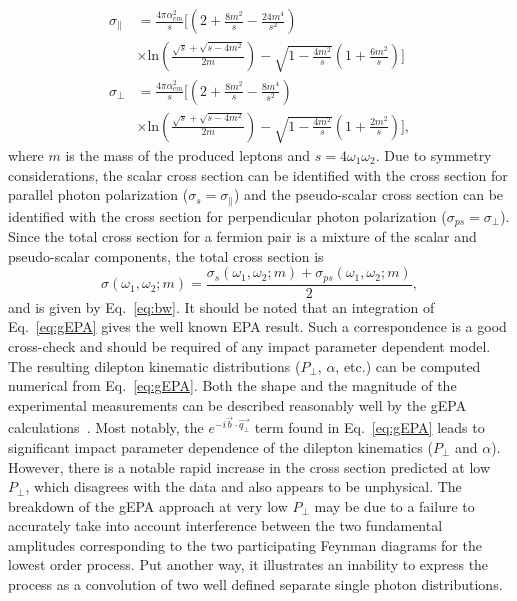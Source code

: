 \documentclass[12pt,epjc3]{svjour3}\sloppy
\begin{document}
\begin{equation}
    \label{eq:bw_pol}
    \begin{aligned}
    \sigma_{\parallel} & = \frac{4\pi \alpha_{em}^{2}}{s} \bigg[\left(2+\frac{8m^{2}}{s} - \frac{24m^{4}}{s^{2}}\right) \\ 
    & \times \text{ln}\left(\frac{\sqrt{s}+\sqrt{s-4m^{2}}}{2m}\right) -\sqrt{1-\frac{4m^{2}}{s}}\left(1+\frac{6m^{2}}{s}\right)\bigg]\\
    \sigma_{\perp} & = \frac{4\pi \alpha_{em}^{2}}{s} \bigg[\left(2+\frac{8m^{2}}{s} - \frac{8m^{4}}{s^{2}}\right) \\
    & \times\text{ln}\left(\frac{\sqrt{s}+\sqrt{s-4m^{2}}}{2m}\right) -\sqrt{1-\frac{4m^{2}}{s}}\left(1+\frac{2m^{2}}{s}\right)\bigg],
    \end{aligned}
\end{equation}
where $m$ is the mass of the produced leptons and $s=4\omega_1\omega_2$. Due to symmetry considerations, the scalar cross section can be identified with the cross section for parallel photon polarization ($\sigma_s=\sigma_\parallel$) and the pseudo-scalar cross section can be identified with the cross section for perpendicular photon polarization ($\sigma_{ps}=\sigma_\perp$). 
Since the total cross section for a fermion pair is a mixture of the scalar and pseudo-scalar components, the total cross section is 
\begin{equation}
    \sigma(\omega_1, \omega_2; m) = \frac{\sigma_{s}(\omega_1, \omega_2; m) + \sigma_{ps}(\omega_1, \omega_2; m)}{2},
\end{equation}
and is given by Eq.~\ref{eq:bw}. It should be noted that an integration of Eq.~\ref{eq:gEPA} gives the well known EPA result. Such a correspondence is a good cross-check and should be required of any impact parameter dependent model. The resulting dilepton kinematic distributions ($P_\perp$, $\alpha$, etc.) can be computed numerical from Eq.~\ref{eq:gEPA}. 
Both the shape and the magnitude of the experimental measurements can be described reasonably well by the gEPA calculations~\cite{zhaInitialTransversemomentumBroadening2020b}. 
Most notably, the $e^{-i\vec{b}\cdot\vec{q_\perp}}$ term found in Eq.~\ref{eq:gEPA} leads to significant impact parameter dependence of the dilepton kinematics ($P_\perp$ and $\alpha$).
However, there is a notable rapid increase in the cross section predicted at low $P_\perp$, which disagrees with the data and also appears to be unphysical. 
The breakdown of the gEPA approach at very low $P_\perp$ may be due to a failure to accurately take into account interference between the two fundamental amplitudes corresponding to the two participating Feynman diagrams for the lowest order process. Put another way, it illustrates an inability to express the process as a convolution of two well defined separate single photon distributions.
\end{document}
